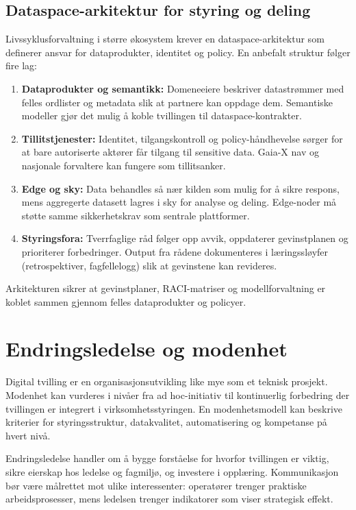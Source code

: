 \subsection*{Dataspace-arkitektur for styring og deling}
Livssyklusforvaltning i større økosystem krever en dataspace-arkitektur som definerer ansvar for dataprodukter, identitet og policy. En anbefalt struktur følger fire lag:
\begin{enumerate}
    \item \textbf{Dataprodukter og semantikk:} Domeneeiere beskriver datastrømmer med felles ordlister og metadata slik at partnere kan oppdage dem. Semantiske modeller gjør det mulig å koble tvillingen til dataspace-kontrakter.\citep{idsa2023ram}
    \item \textbf{Tillitstjenester:} Identitet, tilgangskontroll og policy-håndhevelse sørger for at bare autoriserte aktører får tilgang til sensitive data. Gaia-X nav og nasjonale forvaltere kan fungere som tillitsanker.\citep{gaiax2023architecture}
    \item \textbf{Edge og sky:} Data behandles så nær kilden som mulig for å sikre respons, mens aggregerte datasett lagres i sky for analyse og deling. Edge-noder må støtte samme sikkerhetskrav som sentrale plattformer.\citep{etsi2023mec}
    \item \textbf{Styringsfora:} Tverrfaglige råd følger opp avvik, oppdaterer gevinstplanen og prioriterer forbedringer. Output fra rådene dokumenteres i læringssløyfer (retrospektiver, fagfellelogg) slik at gevinstene kan revideres.
\end{enumerate}
Arkitekturen sikrer at gevinstplaner, RACI-matriser og modellforvaltning er koblet sammen gjennom felles dataprodukter og policyer.

\section{Endringsledelse og modenhet}
Digital tvilling er en organisasjonsutvikling like mye som et teknisk prosjekt. Modenhet kan vurderes i nivåer fra ad hoc-initiativ til kontinuerlig forbedring der tvillingen er integrert i virksomhetsstyringen. En modenhetsmodell kan beskrive kriterier for styringsstruktur, datakvalitet, automatisering og kompetanse på hvert nivå.

Endringsledelse handler om å bygge forståelse for hvorfor tvillingen er viktig, sikre eierskap hos ledelse og fagmiljø, og investere i opplæring. Kommunikasjon bør være målrettet mot ulike interessenter: operatører trenger praktiske arbeidsprosesser, mens ledelsen trenger indikatorer som viser strategisk effekt.

